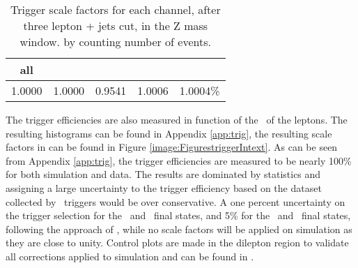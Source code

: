 \begin{table}[h]
	\centering
	\caption{Trigger scale factors for each channel, after three lepton + jets cut, in the Z mass window. by counting number of events.}
	\begin{tabular}{c|c|c|c|c}
		\hline 
		all & \mumumu & \eee & \eemu & \emumu \\ 
		\hline 
		1.0000 & 1.0000 & 0.9541 & 1.0006  & 1.0004\% \\ 
		\hline 
	\end{tabular} 
	\label{tab:trigSFe}
\end{table}

The trigger efficiencies are also measured in function of the \pt\ of the leptons. The resulting histograms can be found in Appendix \ref{app:trig}, the resulting scale factors in can be found in Figure \ref{image:FigurestriggerIntext}.
%	
As can be seen from Appendix \ref{app:trig}, the trigger efficiencies are measured to be nearly 100\% for both simulation and data. The results are dominated by statistics and assigning a large uncertainty to the trigger efficiency based on the dataset collected by \Etmis\ triggers would be over conservative. A one percent uncertainty on the trigger selection for the \eemu\ and \mumumu\ final states, and 5\% for the \eee\ and \emumu\ final states, following the approach of \cite{Sirunyan:2017kkr}, while no scale factors will be applied on simulation as they are close to unity. Control plots are made in the dilepton region to validate all corrections applied to simulation and can be found in .


